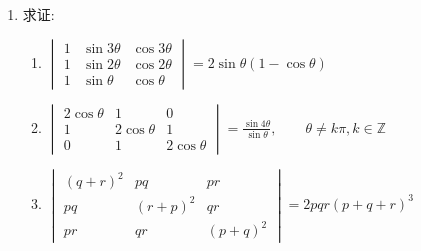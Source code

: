 \begin{enumerate}
\begin{enumerate}
    \item $\begin{vmatrix}x & a & b+c \\ x & a+b & c \\ a+b & b-c & a+c\end{vmatrix}=0,\qquad b(a+b)\ne 0$
\end{enumerate}


\item  求证:
\begin{enumerate}
    \item $\begin{vmatrix}1 & \sin 3 \theta & \cos 3 \theta \\ 1 & \sin 2 \theta & \cos 2 \theta \\ 1 & \sin  \theta & \cos \theta\end{vmatrix}=2 \sin \theta(1-\cos \theta)$
    \item $\begin{vmatrix}2 \cos \theta & 1 & 0 \\ 1 & 2 \cos \theta & 1 \\ 0 & 1 & 2 \cos \theta\end{vmatrix}=\frac{\sin 4 \theta}{\sin \theta},\qquad \theta\ne k\pi, k \in \mathbb{Z}$
    \item $\begin{vmatrix}(q+r)^{2} & p q & p r \\ p q & (r+p)^{2} & q r \\ p r & q r & (p+q)^{2}\end{vmatrix}=2 p q r\left(p+q+r\right)^{3}$
\end{enumerate}


\end{enumerate}
